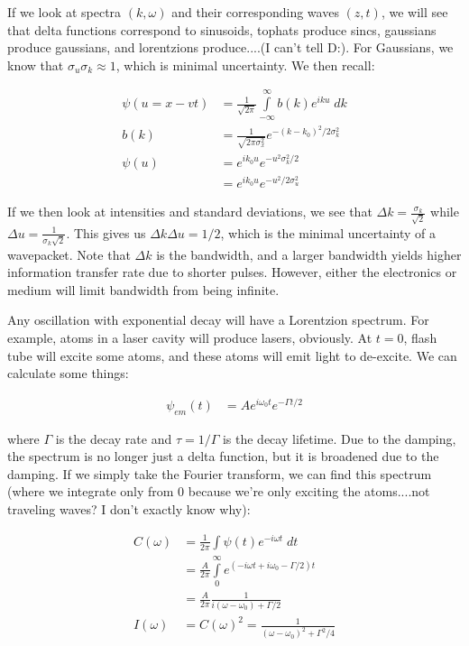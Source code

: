 \documentclass{report}
\begin{document}
If we look at spectra $(k,\omega)$ and their corresponding waves $(z,t)$, we will see that delta functions correspond to sinusoids, tophats produce sincs, gaussians produce gaussians, and lorentzions produce....(I can't tell D:). For Gaussians, we know that $\sigma_u\sigma_k \approx 1$, which is minimal uncertainty. We then recall:

\begin{align*}
\psi(u=x-vt) &= \frac{1}{\sqrt{2\pi}}\displaystyle\int\limits_{-\infty}^\infty{b(k)e^{iku}\;dk}\\
b(k) &= \frac{1}{\sqrt{2\pi\sigma_x^2}}e^{-(k-k_0)^2/2\sigma_k^2}\\
\psi(u) &= e^{ik_0u}e^{-u^2\sigma_k^2/2}\\
&= e^{ik_0u}e^{-u^2/2\sigma_u^2}
\end{align*}

If we then look at intensities and standard deviations, we see that $\Delta k = \frac{\sigma_k}{\sqrt{2}}$ while $\Delta u = \frac{1}{\sigma_k\sqrt{2}}$. This gives us $\Delta k \Delta u = 1/2$, which is the minimal uncertainty of a wavepacket. Note that $\Delta k$ is the bandwidth, and a larger bandwidth yields higher information transfer rate due to shorter pulses. However, either the electronics or medium will limit bandwidth from being infinite. 

Any oscillation with exponential decay will have a Lorentzion spectrum. For example, atoms in a laser cavity will produce lasers, obviously. At $t=0$, flash tube will excite some atoms, and these atoms will emit light to de-excite. We can calculate some things:

\begin{align*}
\psi_{em}(t) &= Ae^{i\omega_0t}e^{-\Gamma t/2}
\end{align*}

where $\Gamma$ is the decay rate and $\tau = 1/\Gamma$ is the decay lifetime. Due to the damping, the spectrum is no longer just a delta function, but it is broadened due to the damping. If we simply take the Fourier transform, we can find this spectrum (where we integrate only from $0$ because we're only exciting the atoms....not traveling waves? I don't exactly know why):

\begin{align*}
C(\omega) &= \frac{1}{2\pi}\int{\psi(t)e^{-i\omega t}\;dt}\\
&= \frac{A}{2\pi}\displaystyle\int\limits_0^\infty{e^{(-i\omega t + i\omega_0 - \Gamma/2)t}}\\
&= \frac{A}{2\pi}\frac{1}{i(\omega - \omega_0) + \Gamma/2}\\
I(\omega) &= C(\omega)^2 = \frac{1}{(\omega - \omega_0)^2 + \Gamma^2/4}
\end{align*}
\end{document}
